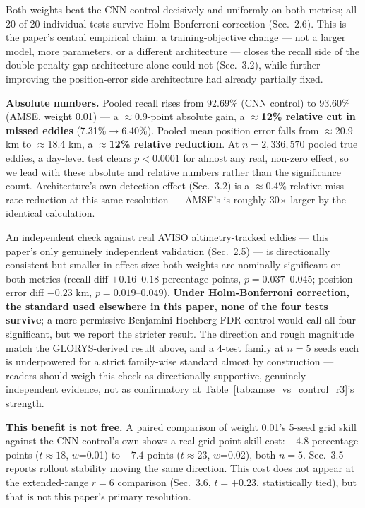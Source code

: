 \documentclass[11pt]{article}
\begin{document}
Both weights beat the CNN control decisively and uniformly on both metrics; all 20 of 20 individual tests survive Holm-Bonferroni correction (Sec.~2.6). This is the paper's central empirical claim: a training-objective change --- not a larger model, more parameters, or a different architecture --- closes the recall side of the double-penalty gap architecture alone could not (Sec.~3.2), while further improving the position-error side architecture had already partially fixed.

\textbf{Absolute numbers.} Pooled recall rises from 92.69\% (CNN control) to 93.60\% (AMSE, weight 0.01) --- a $\approx$0.9-point absolute gain, a \textbf{$\approx$12\% relative cut in missed eddies} (7.31\%$\to$6.40\%). Pooled mean position error falls from $\approx$20.9 km to $\approx$18.4 km, a \textbf{$\approx$12\% relative reduction}. At $n=2{,}336{,}570$ pooled true eddies, a day-level test clears $p<0.0001$ for almost any real, non-zero effect, so we lead with these absolute and relative numbers rather than the significance count. Architecture's own detection effect (Sec.~3.2) is a $\approx$0.4\% relative miss-rate reduction at this same resolution --- AMSE's is roughly 30$\times$ larger by the identical calculation.

An independent check against real AVISO altimetry-tracked eddies --- this paper's only genuinely independent validation (Sec.~2.5) --- is directionally consistent but smaller in effect size: both weights are nominally significant on both metrics (recall diff $+0.16$--$0.18$ percentage points, $p=0.037$--$0.045$; position-error diff $-0.23$ km, $p=0.019$--$0.049$). \textbf{Under Holm-Bonferroni correction, the standard used elsewhere in this paper, none of the four tests survive}; a more permissive Benjamini-Hochberg FDR control would call all four significant, but we report the stricter result. The direction and rough magnitude match the GLORYS-derived result above, and a 4-test family at $n=5$ seeds each is underpowered for a strict family-wise standard almost by construction --- readers should weigh this check as directionally supportive, genuinely independent evidence, not as confirmatory at Table~\ref{tab:amse_vs_control_r3}'s strength.

\textbf{This benefit is not free.} A paired comparison of weight 0.01's 5-seed grid skill against the CNN control's own shows a real grid-point-skill cost: $-4.8$ percentage points ($t\approx18$, $w$=0.01) to $-7.4$ points ($t\approx23$, $w$=0.02), both $n=5$. Sec.~3.5 reports rollout stability moving the same direction. This cost does not appear at the extended-range $r=6$ comparison (Sec.~3.6, $t=+0.23$, statistically tied), but that is not this paper's primary resolution.
\end{document}
